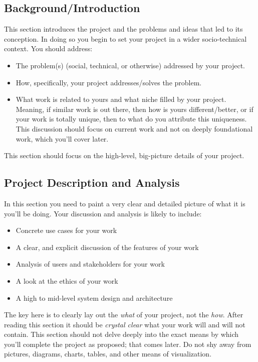 \documentclass[10pt]{article}
\begin{document}
\subsection{Background/Introduction}

This section introduces the project and the problems and ideas that led to its conception.  In doing so you begin to set your project in a wider socio-technical context. You should address:
\begin{itemize}
\item The problem(s) (social, technical, or otherwise) addressed by your project.
\item How, specifically, your project addresses/solves the problem.
\item What work is related to yours and what niche filled by your project. Meaning, if similar work is out there, then how is yours different/better, or if your work is totally unique, then to what do you attribute this uniqueness. This discussion should focus on current work and not on deeply foundational work, which you'll cover later.   
\end{itemize}
This section should focus on the high-level, big-picture details of your project. 

\subsection{Project Description and Analysis}

In this section you need to paint a very clear and detailed picture of what it is you'll be doing. Your discussion and analysis is likely to include:
\begin{itemize}
\item Concrete use cases for your work
\item A clear, and explicit discussion of the features of your work
\item Analysis of users and stakeholders for your work
\item A look at the ethics of your work
\item A high to mid-level system design and architecture 
\end{itemize}
The key here is to clearly lay out the \textit{what} of your project, not the \textit{how}.
After reading this section it should be \textit{crystal clear} what your work will and will not contain. This section should not delve deeply into the exact means by which you'll complete the project as proposed; that comes later. Do not shy away from pictures, diagrams, charts, tables, and other means of visualization. 
\end{document}
